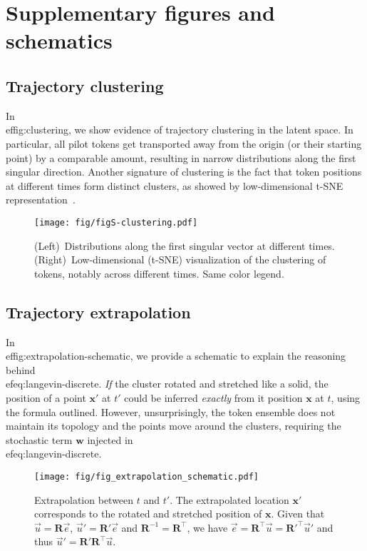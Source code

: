 \documentclass{article} %
\def\rvw{{\mathbf{w}}}
\def\vx{{\bm{x}}}
\def\mR{{\bm{R}}}
\begin{document}
\section{Supplementary figures and schematics}
\label{app:supp-figures}

\subsection{Trajectory clustering}
\label{app:traj-clustering}

In \\ef{fig:clustering}, we show evidence of trajectory clustering in the latent space.
In particular, all pilot tokens get transported away from the origin (or their starting point) by a comparable amount, resulting in narrow distributions along the first singular direction.
Another signature of clustering is the fact that token positions at different times form distinct clusters, as showed by low-dimensional t-SNE representation~\citep{JMLR:v9:vandermaaten08a}.

\begin{figure}[htbp]
\vskip 0.2in
\begin{center}
\centerline{\texttt{[image: fig/figS-clustering.pdf]}}
\caption{
(Left)~Distributions along the first singular vector at different times. 
(Right)~Low-dimensional (t-SNE) visualization of the clustering of tokens, notably across different times. Same color legend.
}
\label{fig:clustering}
\end{center}
\vskip -0.2in
\end{figure}

\subsection{Trajectory extrapolation}
\label{app:traj-extrapolation}
In \\ef{fig:extrapolation-schematic}, we provide a schematic to explain the reasoning behind \\ef{eq:langevin-discrete}.
\emph{If} the cluster rotated and stretched like a solid, the position of a point $\vx'$ at $t'$ could be inferred \emph{exactly} from it position $\vx$ at $t$, using the formula outlined.
However, unsurprisingly, the token ensemble does not maintain its topology and the points move around the clusters, requiring the stochastic term $\rvw$ injected in \\ef{eq:langevin-discrete}.

\begin{figure}[htbp]
\vskip 0.2in
\begin{center}
\centerline{\texttt{[image: fig/fig\_extrapolation\_schematic.pdf]}}
\caption{
Extrapolation between $t$ and $t'$. 
The extrapolated location $\vx'$ corresponds to the rotated and stretched position of $\vx$.
Given that $\vec{u} = \mR \vec{e}$, $\vec{u}' = \mR' \vec{e}$ and $\mR^{-1} = \mR^{\top}$, we have $\vec{e} = \mR^{\top} \vec{u} = \mR'^{\top} \vec{u}'$ and thus $\vec{u}' = \mR' \mR^{\top} \vec{u}$.
}
\label{fig:extrapolation-schematic}
\end{center}
\vskip -0.2in
\end{figure}
\end{document}
